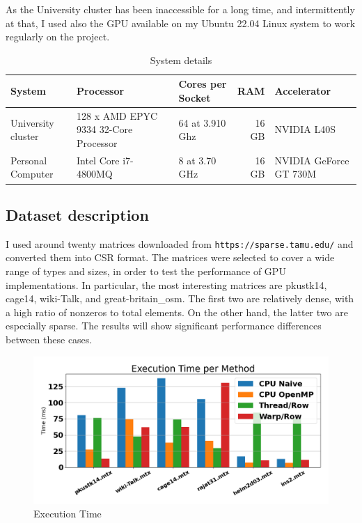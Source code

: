 \documentclass[conference]{IEEEtran}
\begin{document}
As the University cluster has been inaccessible for a long time, and intermittently at that, I used also the GPU available on my Ubuntu 22.04 Linux system to work regularly on the project.

\begin{table}[ht]
    \centering
    \begin{adjustbox}{width=\columnwidth}
    \begin{tabular}{lllrl}
    \toprule
    \textbf{System} &  \textbf{Processor} & \textbf{Cores per Socket} & \textbf{RAM} & \textbf{Accelerator} \\
    \midrule
        University cluster & 128 x AMD EPYC 9334 32-Core Processor & 64 at 3.910 Ghz & 16 GB & NVIDIA L40S \\
        Personal Computer &  Intel Core i7-4800MQ & 8 at 3.70 GHz & 16 GB & NVIDIA GeForce GT 730M \\
    \bottomrule
    \end{tabular}
    \end{adjustbox}
    \vspace{1em}
    
    \caption{System details}
    \label{tab:system_description}
\end{table}

\subsection{Dataset description}

I used around twenty matrices downloaded from \texttt{https://sparse.tamu.edu/} and converted them into CSR format. The matrices were selected to cover a wide range of types and sizes, in order to test the performance of GPU implementations. In particular, the most interesting matrices are pkustk14, cage14, wiki-Talk, and great-britain\_osm. The first two are relatively dense, with a high ratio of nonzeros to total elements. On the other hand, the latter two are especially sparse. The results will show significant performance differences between these cases.



\begin{figure}
    \centering
    \includegraphics[width=1.0\linewidth]{execution_time.png}
    \caption{Execution Time}
    \label{fig:exectimeimg}
\end{figure}
\end{document}
